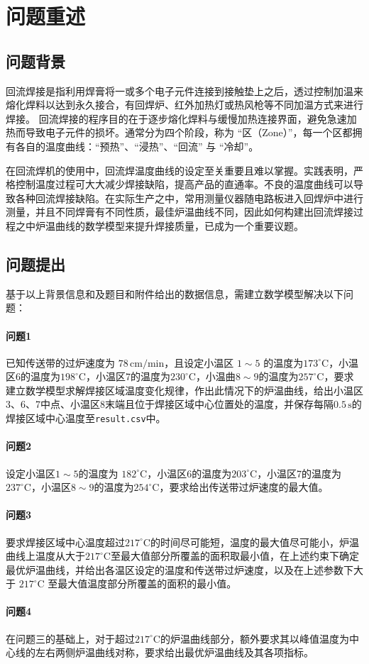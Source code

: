 \documentclass[../main.tex]{subfiles}
\begin{document}
\section{问题重述}
\subsection{问题背景}
回流焊接是指利用焊膏将一或多个电子元件连接到接触垫上之后，透过控制加温来熔化焊料以达到永久接合，有回焊炉、红外加热灯或热风枪等不同加温方式来进行焊接。
回流焊接的程序目的在于逐步熔化焊料与缓慢加热连接界面，避免急速加热而导致电子元件的损坏。通常分为四个阶段，称为 “区（Zone）”，每一个区都拥有各自的温度曲线：“预热”、“浸热”、“回流” 与 “冷却”。

在回流焊机的使用中，回流焊温度曲线的设定至关重要且难以掌握。实践表明，严格控制温度过程可大大减少焊接缺陷，提高产品的直通率。不良的温度曲线可以导致各种回流焊接缺陷。在实际生产之中，常用测量仪器随电路板进入回焊炉中进行测量，并且不同焊膏有不同性质，最佳炉温曲线不同，因此如何构建出回流焊接过程之中炉温曲线的数学模型来提升焊接质量，已成为一个重要议题。

\subsection{问题提出} %
基于以上背景信息和及题目和附件给出的数据信息，需建立数学模型解决以下问题：

\paragraph{问题1}
已知传送带的过炉速度为 \(78\,\mathrm{cm}/\mathrm{min}\)，且设定小温区 \(1{\sim}5\) 的温度为\(173^{\circ} \mathrm{C}\)，小温区6的温度为\(198^{\circ}\mathrm{C}\)，小温区7的温度为\(230^{\circ}\mathrm{C}\)，小温曲\(8{ \sim }9\)的温度为\(257^{\circ}\mathrm{C}\)，要求建立数学模型求解焊接区域温度变化规律，作出此情况下的炉温曲线，给出小温区3、6、7中点、小温区8末端且位于焊接区域中心位置处的温度，并保存每隔\(0.5\, \mathrm{s}\)的焊接区域中心温度至\texttt{result.csv}中。

\paragraph{问题2}
设定小温区\(1{\sim}5\)的温度为 \(182^{\circ}\mathrm{C}\)，小温区6的温度为\(203^{\circ}\mathrm{C}\)，小温区7的温度为\(237^{\circ}\mathrm{C}\)，小温区\(8{\sim}9\)的温度为\(254^{\circ}\mathrm{C}\)，要求给出传送带过炉速度的最大值。

\paragraph{问题3}
要求焊接区域中心温度超过\(217^{\circ}\mathrm{C}\)的时间尽可能短，温度的最大值尽可能小，炉温曲线上温度从大于\(217^{\circ}\mathrm{C}\)至最大值部分所覆盖的面积取最小值，在上述约束下确定最优炉温曲线，并给出各温区设定的温度和传送带过炉速度，以及在上述参数下大于 \(217 ^{\circ}\mathrm{C}\) 至最大值温度部分所覆盖的面积的最小值。

\paragraph{问题4}
在问题三的基础上，对于超过\(217 ^{\circ}\mathrm{C}\)的炉温曲线部分，额外要求其以峰值温度为中心线的左右两侧炉温曲线对称，要求给出最优炉温曲线及其各项指标。
\end{document}
